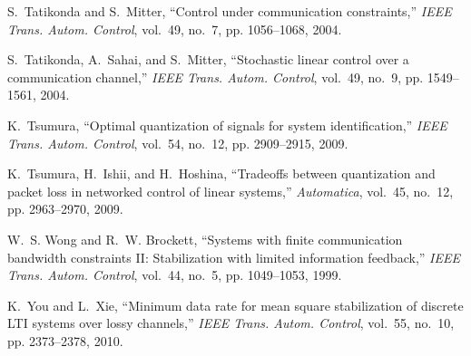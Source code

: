 \documentclass[a4paper, 11pt]{article}
\theoremstyle{definition}
\newcommand{\IEEEJAC}{{IEEE} Trans. Autom. Control}
\begin{document}
\begin{thebibliography}{10}
S.~Tatikonda and S.~Mitter, ``{Control under communication constraints},''
  \emph{\IEEEJAC}, vol.~49, no.~7, pp. 1056--1068, 2004.

S.~Tatikonda, A.~Sahai, and S.~Mitter, ``{Stochastic linear control over a
  communication channel},'' \emph{\IEEEJAC}, vol.~49, no.~9, pp. 1549--1561,
  2004.

K.~Tsumura, ``{Optimal quantization of signals for system identification},''
  \emph{\IEEEJAC}, vol.~54, no.~12, pp. 2909--2915, 2009.

K.~Tsumura, H.~Ishii, and H.~Hoshina, ``{Tradeoffs between quantization and
  packet loss in networked control of linear systems},'' \emph{Automatica},
  vol.~45, no.~12, pp. 2963--2970, 2009.

W.~S. Wong and R.~W. Brockett, ``{Systems with finite communication bandwidth
  constraints II: Stabilization with limited information feedback},''
  \emph{\IEEEJAC}, vol.~44, no.~5, pp. 1049--1053, 1999.

K.~You and L.~Xie, ``{Minimum data rate for mean square stabilization of
  discrete LTI systems over lossy channels},'' \emph{\IEEEJAC}, vol.~55,
  no.~10, pp. 2373--2378, 2010.

\end{thebibliography}
\normalsize
\end{document}
